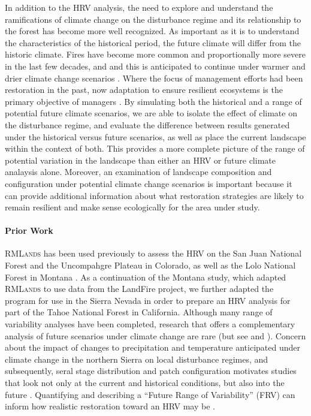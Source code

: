 \documentclass[12pt]{article}
\begin{document}
\begin{spacing}{1}
In addition to the HRV analysis, the need to explore and understand the ramifications of climate change on the disturbance regime and its relationship to the forest has become more well recognized. As important as it is to understand the characteristics of the historical period, the future climate will differ from the historic climate. Fires have become more common and proportionally more severe in the last few decades, and and this is anticipated to continue under warmer and drier climate change scenarios \citep{McKenzie2004,Westerling2007,Dale2001}. Where the focus of management efforts had been restoration in the past, now adaptation to ensure resilient ecosystems is the primary objective of managers \citep{Stephens2010}. By simulating both the historical and a range of potential future climate scenarios, we are able to isolate the effect of climate on the disturbance regime, and evaluate the difference between results generated under the historical versus future scenarios, as well as place the current landscape within the context of both. This provides a more complete picture of the range of potential variation in the landscape than either an HRV or future climate analaysis alone. Moreover, an examination of landscape composition and configuration under potential climate change scenarios is important because it can provide additional information about what restoration strategies are likely to remain resilient and make sense ecologically for the area under study. 

\paragraph{Prior Work}
\textsc{RMLands} has been used previously to assess the HRV on the San Juan National Forest \citep{Mcgarigal2012} and the Uncompahgre Plateau \citep{Romme2009} in Colorado, as well as the Lolo National Forest in Montana \citep{Cushman2011}. As a continuation of the Montana study, which adapted \textsc{RMLands} to use data from the LandFire project, we further adapted the program for use in the Sierra Nevada in order to prepare an HRV analysis for part of the Tahoe National Forest in California. Although many range of variability analyses have been completed, research that offers a complementary analysis of future scenarios under climate change are rare (but see \cite{Keane2008} and \cite{Duveneck2014}). Concern about the impact of changes to precipitation and temperature anticipated under climate change in the northern Sierra on local disturbance regimes, and subsequently, seral stage distribution and patch configuration motivates studies that look not only at the current and historical conditions, but also into the future \citep{Fule2008,North2012}. Quantifying and describing a ``Future Range of Variability'' (FRV) can inform how realistic restoration toward an HRV may be \citep{Duncan2010}.


\end{spacing}
\end{document}
